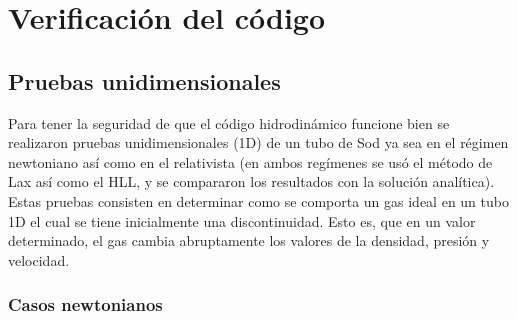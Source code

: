 \documentclass[12pt,a4paper]{book}
\begin{document}

\chapter{Verificación del código}\label{cap:Verificacion_del_codigo}


\section{Pruebas unidimensionales}

Para tener la seguridad de que el código hidrodinámico funcione bien se realizaron pruebas  unidimensionales (1D)
de un tubo de Sod ya sea en el régimen newtoniano así como en el relativista (en ambos regímenes se usó
el método de Lax así como el HLL, y se compararon los resultados con la solución analítica). 
Estas pruebas consisten en determinar como se comporta un gas ideal en un tubo 1D 
el cual se tiene inicialmente una discontinuidad. Esto es, que en un valor determinado,
el gas cambia abruptamente los valores de la densidad, presión y velocidad.




\subsection{Casos newtonianos}
\end{document}
